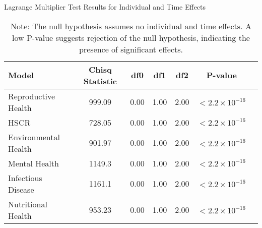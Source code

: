 \begin{table}[ht]
    \centering
    \caption{Lagrange Multiplier Test Results for Individual and Time Effects}
    \begin{tabular}{lcccccc}
        \toprule
        \textbf{Model} & \textbf{Chisq Statistic} & \textbf{df0} & \textbf{df1} & \textbf{df2} & \textbf{P-value} \\
        \midrule
        Reproductive Health & 999.09 & 0.00 & 1.00 & 2.00 & $< 2.2 \times 10^{-16}$ \\
        HSCR & 728.05 & 0.00 & 1.00 & 2.00 & $< 2.2 \times 10^{-16}$ \\
        Environmental Health & 901.97 & 0.00 & 1.00 & 2.00 & $< 2.2 \times 10^{-16}$ \\
        Mental Health & 1149.3 & 0.00 & 1.00 & 2.00 & $< 2.2 \times 10^{-16}$ \\
        Infectious Disease & 1161.1 & 0.00 & 1.00 & 2.00 & $< 2.2 \times 10^{-16}$ \\
        Nutritional Health & 953.23 & 0.00 & 1.00 & 2.00 & $< 2.2 \times 10^{-16}$ \\
        \bottomrule
    \end{tabular}
    \vspace{0.5em} %
    \caption*{Note: The null hypothesis assumes no individual and time effects. A low P-value suggests rejection of the null hypothesis, indicating the presence of significant effects.}
    \label{Tab::Panel_Test}
\end{table}
